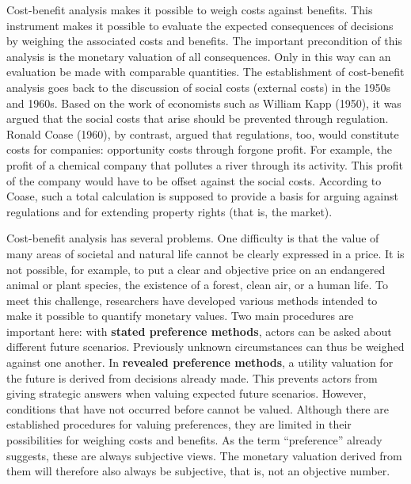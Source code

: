 \documentclass[
  british,
  a4paper,
  DIV=11,
  numbers=noendperiod,
  oneside,
  openany]{scrreprt}
\begin{document}
\begin{tcolorbox}[enhanced jigsaw, arc=.35mm, bottomrule=.15mm, bottomtitle=1mm, breakable, colback=white, colbacktitle=quarto-callout-tip-color!10!white, colframe=quarto-callout-tip-color-frame, coltitle=black, left=2mm, leftrule=.75mm, opacityback=0, opacitybacktitle=0.6, rightrule=.15mm, title={Excursus -- Cost-benefit analysis}, titlerule=0mm, toprule=.15mm, toptitle=1mm]

Cost-benefit analysis makes it possible to weigh costs against benefits.
This instrument makes it possible to evaluate the expected consequences
of decisions by weighing the associated costs and benefits. The
important precondition of this analysis is the monetary valuation of all
consequences. Only in this way can an evaluation be made with comparable
quantities. The establishment of cost-benefit analysis goes back to the
discussion of social costs (external costs) in the 1950s and 1960s.
Based on the work of economists such as William Kapp (1950), it was
argued that the social costs that arise should be prevented through
regulation. Ronald Coase (1960), by contrast, argued that regulations,
too, would constitute costs for companies: opportunity costs through
forgone profit. For example, the profit of a chemical company that
pollutes a river through its activity. This profit of the company would
have to be offset against the social costs. According to Coase, such a
total calculation is supposed to provide a basis for arguing against
regulations and for extending property rights (that is, the market).

Cost-benefit analysis has several problems. One difficulty is that the
value of many areas of societal and natural life cannot be clearly
expressed in a price. It is not possible, for example, to put a clear
and objective price on an endangered animal or plant species, the
existence of a forest, clean air, or a human life. To meet this
challenge, researchers have developed various methods intended to make
it possible to quantify monetary values. Two main procedures are
important here: with \textbf{stated preference methods}, actors can be
asked about different future scenarios. Previously unknown circumstances
can thus be weighed against one another. In \textbf{revealed preference
methods}, a utility valuation for the future is derived from decisions
already made. This prevents actors from giving strategic answers when
valuing expected future scenarios. However, conditions that have not
occurred before cannot be valued. Although there are established
procedures for valuing preferences, they are limited in their
possibilities for weighing costs and benefits. As the term
``preference'' already suggests, these are always subjective views. The
monetary valuation derived from them will therefore also always be
subjective, that is, not an objective number.


\end{tcolorbox}
\end{document}
